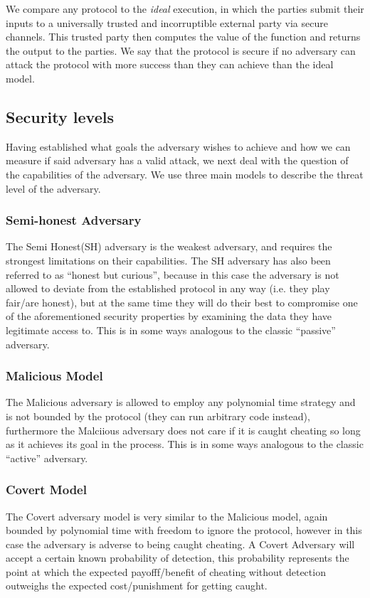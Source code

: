 \documentclass[a4paper,10pt]{article}
\begin{document}
			We compare any protocol to the \emph{ideal} execution, in which the parties submit their inputs to a universally trusted and incorruptible external party via secure channels. This trusted party then computes the value of the function and returns the output to the parties. We say that the protocol is secure if no adversary can attack the protocol with more success than they can achieve than the ideal model.


		\subsection{Security levels}\label{sub:securityLevels}
			Having established what goals the adversary wishes to achieve and how we can measure if said adversary has a valid attack, we next deal with the question of the capabilities of the adversary. We use three main models to describe the threat level of the adversary.

			\subsubsection{Semi-honest Adversary}
				The Semi Honest(SH) adversary is the weakest adversary, and requires the strongest limitations on their capabilities. The SH adversary has also been referred to as ``honest but curious'', because in this case the adversary is not allowed to deviate from the established protocol in any way (i.e. they play fair/are honest), but at the same time they will do their best to compromise one of the aforementioned security properties by examining the data they have legitimate access to. This is in some ways analogous to the classic ``passive'' adversary.

			\subsubsection{Malicious Model}
				The Malicious adversary is allowed to employ any polynomial time strategy and is not bounded by the protocol (they can run arbitrary code instead), furthermore the Malciious adversary does not care if it is caught cheating so long as it achieves its goal in the process. This is in some ways analogous to the classic ``active'' adversary.

			\subsubsection{Covert Model}
				The Covert adversary model is very similar to the Malicious model, again bounded by polynomial time with freedom to ignore the protocol, however in this case the adversary is adverse to being caught cheating. A Covert Adversary will accept a certain known probability of detection, this probability represents the point at which the expected payofff/benefit of cheating without detection outweighs the expected cost/punishment for getting caught.\\
\end{document}
